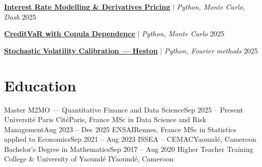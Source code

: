   \resumeProjectHeading
    {\href{https://usenamefd.github.io/projects/courbes-de-taux.html}{\textbf{Interest Rate Modelling \& Derivatives Pricing}} $|$ \emph{Python, Monte Carlo, Dash}} {2025}
    \resumeItemListStart
    \resumeItemListEnd

  \resumeProjectHeading
    {\href{https://usenamefd.github.io/projects/creditvar-copules.html}{\textbf{CreditVaR with Copula Dependence}} $|$ \emph{Python, Monte Carlo}} {2025}
    \resumeItemListStart
    \resumeItemListEnd

  \resumeProjectHeading
    {\href{https://usenamefd.github.io/projects/calibration-heston-filtrage.html}{\textbf{Stochastic Volatility Calibration --- Heston}} $|$ \emph{Python, Fourier methods}} {2025}
    \resumeItemListStart
    \resumeItemListEnd
\resumeSubHeadingListEnd

\section{Education}
\resumeSubHeadingListStart
  \resumeSubheading
    {Master M2MO --- Quantitative Finance and Data Science}{Sep 2025 -- Present}
    {Universit\'e Paris Cit\'e}{Paris, France}
  \vspace{3pt}
  \resumeSubheading
    {MSc in Data Science and Risk Management}{Aug 2023 -- Dec 2025}
    {ENSAI}{Rennes, France}
  \vspace{3pt}
  \resumeSubheading
    {MSc in Statistics applied to Economics}{Sep 2021 -- Aug 2023}
    {ISSEA -- CEMAC}{Yaound\'e, Cameroon}
  \vspace{3pt}
  \resumeSubheading
    {Bachelor's Degree in Mathematics}{Sep 2017 -- Aug 2020}
    {Higher Teacher Training College \& University of Yaound\'e I}{Yaound\'e, Cameroon}
\resumeSubHeadingListEnd

